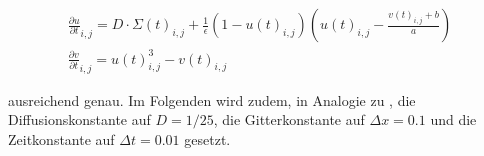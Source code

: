 \begin{equation}
\begin{gathered}
\frac{\partial u}{\partial t}_{i,j} = D \cdot \Sigma(t)_{i,j} + \frac{1}{\epsilon} (1-u(t)_{i,j}) \left(u(t)_{i,j}-\frac{v(t)_{i,j}+b}{a}\right)\\
\frac{\partial v}{\partial t}_{i,j} = u(t)_{i,j}^3-v(t)_{i,j}
\end{gathered}
\end{equation}

ausreichend genau. Im Folgenden wird zudem, in Analogie zu \citep{berg2011synchronization}, die Diffusionskonstante auf $D = 1/25$, die Gitterkonstante auf $\Delta x = 0.1$ und die Zeitkonstante auf $\Delta t = 0.01$ gesetzt. 